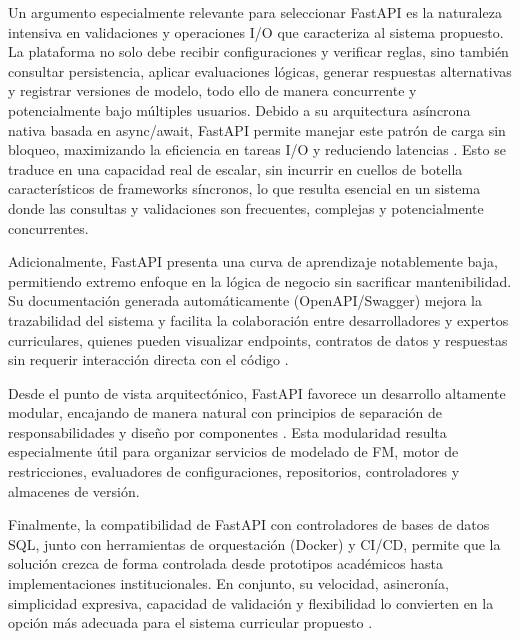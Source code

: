 {{        Un argumento especialmente relevante para seleccionar FastAPI es la naturaleza 
        intensiva en validaciones y operaciones \ac{I/O} que caracteriza al sistema propuesto. 
        La plataforma no solo debe recibir configuraciones y verificar reglas, sino también 
        consultar persistencia, aplicar evaluaciones lógicas, generar respuestas alternativas y 
        registrar versiones de modelo, todo ello de manera concurrente y potencialmente bajo 
        múltiples usuarios. Debido a su arquitectura asíncrona nativa basada en async/await, 
        FastAPI permite manejar este patrón de carga sin bloqueo, maximizando la eficiencia en 
        tareas \ac{I/O} y reduciendo latencias \citep{eugene2023fastapi, pesce2021benchmark}. Esto se 
        traduce en una capacidad real de escalar, sin incurrir en cuellos de botella característicos 
        de frameworks síncronos, lo que resulta esencial en un sistema donde las consultas y 
        validaciones son frecuentes, complejas y potencialmente concurrentes.

        Adicionalmente, FastAPI presenta una curva de aprendizaje notablemente baja, 
        permitiendo extremo enfoque en la lógica de negocio sin sacrificar mantenibilidad. 
        Su documentación generada automáticamente (OpenAPI/Swagger) mejora la trazabilidad 
        del sistema y facilita la colaboración entre desarrolladores y expertos curriculares, 
        quienes pueden visualizar endpoints, contratos de datos y respuestas sin requerir 
        interacción directa con el código \citep{ramirez2019fastapi}.

        Desde el punto de vista arquitectónico, FastAPI favorece un desarrollo altamente 
        modular, encajando de manera natural con principios de separación de responsabilidades y 
        diseño por componentes \citep{richards2015software}. Esta modularidad resulta especialmente 
        útil para organizar servicios de modelado de FM, motor de restricciones, evaluadores de 
        configuraciones, repositorios, controladores y almacenes de versión.

        Finalmente, la compatibilidad de FastAPI con controladores de bases de datos \ac{SQL}, 
        junto con herramientas de orquestación (Docker) y \ac{CI/CD}, permite 
        que la solución crezca de forma controlada desde prototipos académicos hasta implementaciones 
        institucionales. En conjunto, su velocidad, asincronía, simplicidad expresiva, capacidad de
        validación y flexibilidad lo convierten en la opción más adecuada para el sistema curricular 
        propuesto \citep{eugene2023fastapi}.
        
}}
